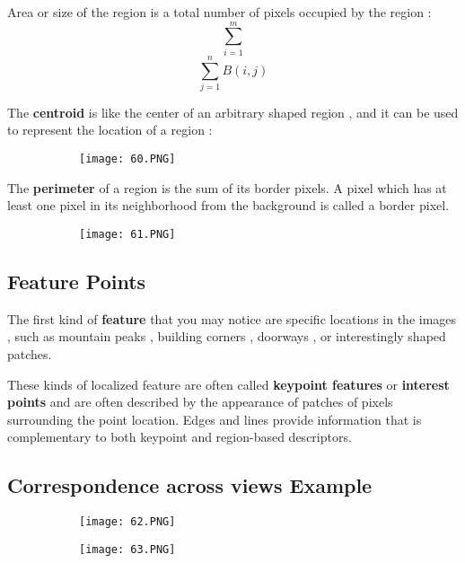\documentclass{article}
\begin{document}
\vspace{3mm}

Area or size of the region is a total number of pixels occupied by the region : \[\sum_{i=1}^m \]\[\sum_{j=1}^n B(i,j)\]

The \textbf{centroid} is like the center of an arbitrary shaped region , and it can be used to represent the location of a region : 

\begin{figure}[ht!]
  \centering
  \begin{subfigure}[b]{0.2\linewidth}
    \texttt{[image: 60.PNG]}
  \end{subfigure}
\end{figure}

The \textbf{perimeter} of a region is the sum of its border pixels. A pixel which has at least one pixel in its neighborhood from the background is called a border pixel.


\begin{figure}[ht!]
  \centering
  \begin{subfigure}[b]{0.4\linewidth}
    \texttt{[image: 61.PNG]}
  \end{subfigure}
\end{figure}

\subsection{Feature Points}

The first kind of \textbf{feature} that you may notice are specific locations in the images , such as mountain peaks , building corners , doorways , or interestingly shaped patches.

These kinds of localized feature are often called \textbf{keypoint features} or \textbf{interest points} and are often described by the appearance of patches of pixels surrounding the point location.
Edges and lines provide information that is complementary to both keypoint and region-based descriptors.



\subsection{Correspondence across views Example}


\begin{figure}[ht!]
  \centering
  \begin{subfigure}[b]{0.4\linewidth}
    \texttt{[image: 62.PNG]}
  \end{subfigure}
  \begin{subfigure}[b]{0.4\textwidth}
         \centering
         \texttt{[image: 63.PNG]}
     \end{subfigure}
\end{figure}
\end{document}
